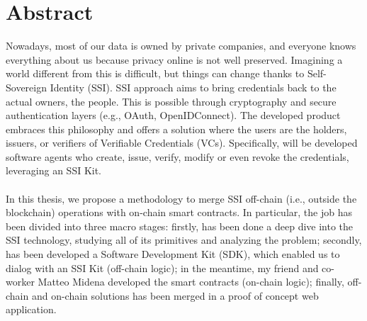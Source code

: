 
\cleardoublepage
{}
{}
\begingroup
\let\clearpage\relax
\let\cleardoublepage\relax
\let\cleardoublepage\relax

\chapter*{Abstract}

Nowadays, most of our data is owned by private companies, and everyone knows 
everything about us because privacy online is not well preserved. Imagining a 
world different from this is difficult, but things can change thanks to 
Self-Sovereign Identity (SSI). SSI approach aims to bring credentials back to the 
actual owners, the people. This is possible through cryptography and secure 
authentication layers (e.g., OAuth, OpenIDConnect). The developed product embraces 
this philosophy and offers a solution where the users are the holders, issuers, or 
verifiers of Verifiable Credentials (VCs). Specifically, will be developed software 
agents who create, issue, verify, modify or even revoke the credentials, leveraging 
an SSI Kit.\\\\
In this thesis, we propose a methodology to merge SSI off-chain (i.e., outside the 
blockchain) operations with on-chain smart contracts. In particular, the job has been 
divided into three macro stages: firstly, has been done a deep dive into the SSI 
technology, studying all of its primitives and analyzing the problem; secondly, has 
been developed a Software Development Kit (SDK), which enabled us to dialog with an 
SSI Kit (off-chain logic); in the meantime, my friend and co-worker Matteo Midena 
developed the smart contracts (on-chain logic); finally, off-chain and on-chain 
solutions has been merged in a proof of concept web application.

\endgroup			

\vfill

